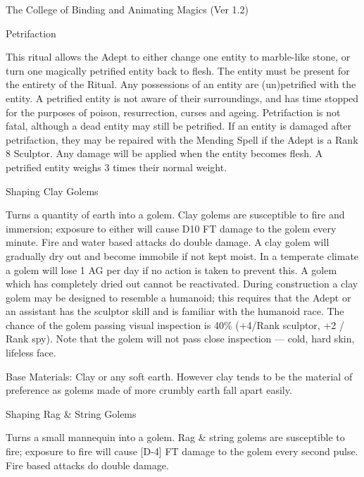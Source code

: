 \begin{Chapter}{The College of Binding and Animating Magics (Ver 1.2)}
\begin{ritual}[Q-2]{Petrifaction}
\begin{effects}
This ritual allows the Adept to either change one entity to
marble-like stone, or turn one magically petrified entity back to
flesh.  The entity must be present for the entirety of the Ritual.
Any possessions of an entity are (un)petrified with the entity.  A
petrified entity is not aware of their surroundings, and has time
stopped for the purposes of poison, resurrection, curses and
ageing. Petrifaction is not fatal, although a dead entity may still be
petrified. If an entity is damaged after petrifaction, they may be
repaired with the Mending Spell if the Adept is a Rank 8 Sculptor.
Any damage will be applied when the entity becomes flesh. A petrified
entity weighs 3 times their normal weight.
\end{effects}
\end{ritual}

\begin{ritual}[Q-3]{Shaping Clay Golems}
\begin{effects}
Turns a quantity of earth into a golem.  Clay golems are susceptible
to fire and immersion; exposure to either will cause D10 FT damage to
the golem every minute.  Fire and water based attacks do double
damage.  A clay golem will gradually dry out and become immobile if
not kept moist.  In a temperate climate a golem will lose 1 AG per day
if no action is taken to prevent this. A golem which has completely
dried out cannot be reactivated. During construction a clay golem may
be designed to resemble a humanoid; this requires that the Adept or an
assistant has the sculptor skill and is familiar with the humanoid
race. The chance of the golem passing visual inspection is 40\%
(+4/Rank sculptor, +2 / Rank spy).  Note that the golem will not pass
close inspection — cold, hard skin, lifeless face.

Base Materials: Clay or any soft earth.  However clay tends to be the
material of preference as golems made of more crumbly earth fall apart
easily.
\end{effects}
\end{ritual}

\begin{ritual}[Q-4]{Shaping Rag \& String Golems}
\begin{effects}
Turns a small mannequin into a golem.  Rag \& string golems are
susceptible to fire; exposure to fire will cause [D-4] FT damage to
the golem every second pulse.  Fire based attacks do double damage.


\end{effects}
\end{ritual}
\end{Chapter}
